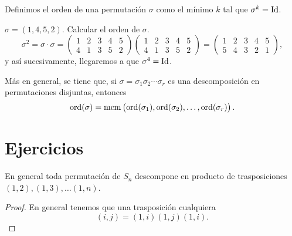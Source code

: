 \begin{defi}
    Definimos el orden de una permutación $\sigma$ como el mínimo $k$ tal que $\sigma^k = \operatorname{Id}$.
\end{defi}

\begin{example}
    $\sigma = (1, 4, 5, 2)$. Calcular el orden de $\sigma$.
    \[
        \sigma^2 = \sigma \cdot \sigma =
        \begin{pmatrix}
            1 & 2 & 3 & 4 & 5 \\
            4 & 1 & 3 & 5 &2
        \end{pmatrix}
        \begin{pmatrix}
            1 & 2 & 3 & 4 & 5 \\
            4 & 1 & 3 & 5 & 2
        \end{pmatrix} = 
        \begin{pmatrix}
            1 & 2 & 3 & 4 & 5 \\
            5 & 4 & 3 & 2 & 1
        \end{pmatrix},
    \]
    y así sucesivamente, llegaremos a que $\sigma^4 = \operatorname{Id}$.
\end{example}

\begin{prop}
Más en general, se tiene que, si $\sigma = \sigma_1 \sigma_2 \cdots \sigma_r$ es una descomposición en permutaciones disjuntas, entonces
\[
    \operatorname{ord}(\sigma) = \operatorname{mcm} \left( \operatorname{ord} (\sigma_1), \operatorname{ord}(\sigma_2), \dots, \operatorname{ord}(\sigma_r) \right).
\]
\end{prop}

\section{Ejercicios}

\begin{ej} %
    En general toda permutación de $S_n$ descompone en producto de trasposiciones
    $(1, 2), (1, 3), \dots (1, n)$.
\end{ej}

\begin{proof}
    En general tenemos que una trasposición cualquiera
    \[
        (i, j) = (1, i)(1, j)(1,i).
    \]
\end{proof}

